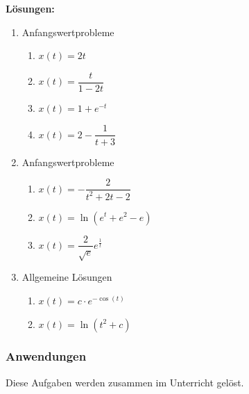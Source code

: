 \textbf{Lösungen:}

\begin{enumerate}
    \item Anfangswertprobleme
          \begin{enumerate}[label=\alph*)]
              \item \(x(t)=2t\)
              \item \(x(t)=\dfrac{t}{1-2t}\)
              \item \(x(t)=1+e^{-t}\)
              \item \(x(t)=2-\dfrac{1}{t+3}\)
          \end{enumerate}

    \item Anfangswertprobleme
          \begin{enumerate}[label=\alph*)]
              \item \(x(t)=-\dfrac{2}{t^2+2t-2}\)
              \item \(x(t)=\ln(e^t+e^2-e)\)
              \item \(x(t)=\dfrac{2}{\sqrt{e}}e^{\frac{1}{t}}\)
          \end{enumerate}

    \item Allgemeine Lösungen
          \begin{enumerate}[label=\alph*)]
              \item \(x(t)=c\cdot e^{-\cos(t)}\)
              \item \(x(t)=\ln(t^2+c)\)
          \end{enumerate}
\end{enumerate}








\clearpage

\subsubsection{Anwendungen}

Diese Aufgaben werden zusammen im Unterricht gelöst.

